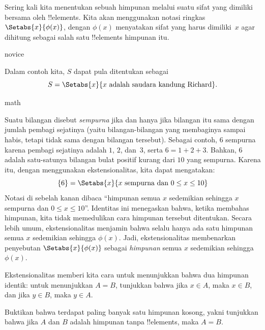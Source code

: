 \documentclass[../../../include/open-logic-section]{subfiles}
\begin{document}
Sering kali kita menentukan sebuah himpunan melalui suatu sifat yang
dimiliki bersama oleh !!{element}s. Kita akan menggunakan
notasi ringkas $\Setabs{x}{\phi(x)}$, dengan $\phi(x)$ menyatakan sifat
yang harus dimiliki~$x$ agar dihitung sebagai salah satu !!{element}s
himpunan itu.

\begin{tagblock}{novice}
\begin{ex}
Dalam contoh kita, $S$ dapat pula ditentukan sebagai
\[
S = \Setabs{x}{x \text{ adalah saudara kandung Richard}}.
\]
\end{ex}
\end{tagblock}

\begin{tagblock}{math}
\begin{ex}
Suatu bilangan disebut \emph{sempurna} jika dan hanya jika bilangan itu
sama dengan jumlah pembagi sejatinya (yaitu bilangan-bilangan yang
membaginya sampai habis, tetapi tidak sama dengan bilangan tersebut).
Sebagai contoh, $6$ sempurna karena pembagi sejatinya adalah $1$, $2$,
dan~$3$, serta $6 = 1 + 2 + 3$. Bahkan, $6$ adalah satu-satunya
bilangan bulat positif kurang dari $10$ yang sempurna. Karena itu,
dengan menggunakan ekstensionalitas, kita dapat mengatakan:
\[
	\{6\} = \Setabs{x}{x\text{ sempurna dan }0 \leq x \leq 10}
\]
Notasi di sebelah kanan dibaca ``himpunan semua $x$ sedemikian sehingga
$x$ sempurna dan $0 \leq x \leq 10$''. Identitas ini menegaskan bahwa,
ketika membahas himpunan, kita tidak memedulikan cara himpunan tersebut
ditentukan. Secara lebih umum, ekstensionalitas menjamin bahwa selalu
hanya ada satu himpunan semua $x$ sedemikian sehingga $\phi(x)$.
Jadi, ekstensionalitas membenarkan penyebutan
$\Setabs{x}{\phi(x)}$ sebagai \emph{himpunan} semua $x$ sedemikian
sehingga~$\phi(x)$.
\end{ex}
\end{tagblock}

Ekstensionalitas memberi kita cara untuk menunjukkan bahwa dua
himpunan identik: untuk menunjukkan $A = B$, tunjukkan bahwa jika
$x \in A$, maka $x \in B$, dan jika $y \in B$, maka $y \in A$.

\begin{prob}
Buktikan bahwa terdapat paling banyak satu himpunan kosong, yakni
tunjukkan bahwa jika $A$ dan $B$ adalah himpunan tanpa !!{element}s,
maka $A = B$.
\end{prob}
\end{document}
